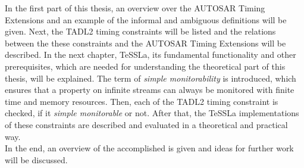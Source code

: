 	In the first part of this thesis, an overview over the AUTOSAR Timing Extensions and an example of the informal and ambiguous definitions  will be given. Next, the TADL2 timing constraints will be listed and the relations between the these constraints and the AUTOSAR Timing Extensions will be described.
	In the next chapter, TeSSLa, its fundamental functionality and other prerequisites, which are needed for understanding the theoretical part of this thesis, will be explained.
	The term of \emph{simple monitorability} is introduced, which ensures that a property on infinite streams can always be monitored with finite time and memory resources.
	Then, each of the TADL2 timing constraint is checked, if it \textit{simple monitorable} or not. After that, the TeSSLa implementations of these constraints are described and evaluated in a theoretical and practical way.\\
	In the end, an overview of the accomplished is given and ideas for further work will be discussed.